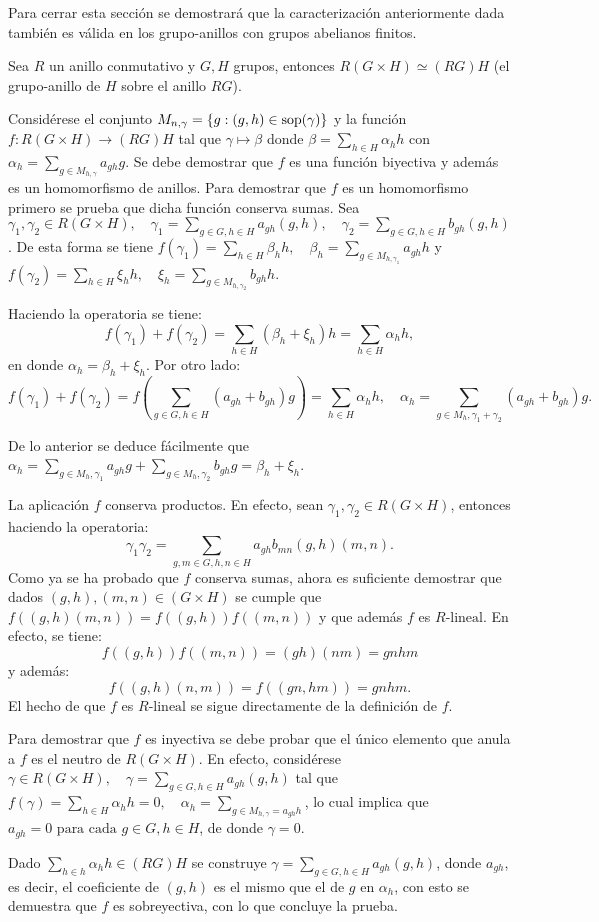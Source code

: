 Para cerrar esta sección se demostrará que la caracterización anteriormente dada  también es válida en los grupo-anillos con grupos  abelianos finitos.

\begin{lema}\label{lema1}
Sea $R$ un anillo conmutativo y $G, H$ grupos, entonces $R(G \times H) \simeq (RG)H$ (el grupo-anillo de $H$ sobre el anillo $RG$).
\end{lema}
\begin{proof*}
Considérese el conjunto $M_{n,\gamma} = \{ g: (g,h) \in \operatorname{sop}(\gamma)\}$ y la función $f \colon R(G \times H) \to (RG)H$ tal que $\gamma \mapsto \beta $ donde $\beta = \sum_{h \in H} \alpha_hh $  con $\alpha_h = \sum_{g \in M_{h,\gamma}}a_{gh}g$. Se debe demostrar que $f$ es una función biyectiva y además es un homomorfismo de anillos.
Para demostrar que $f$ es un homomorfismo primero se prueba que dicha función conserva sumas.
Sea $\gamma_1, \gamma_2 \in R(G \times H),\quad \gamma_1 = \sum_{g \in G, h \in H}a_{gh}(g,h), \quad  \gamma_2 = \sum_{g\in G, h\in H}b_{gh}(g,h)$. De esta forma se tiene $f(\gamma_1) = \sum_{h \in H}\beta_hh, \quad \beta_h = \sum_{g\in M_{h,\gamma_1}}a_{gh}h$ y $f(\gamma_2) = \sum_{h\in H}\xi_hh,\quad \xi_h = \sum_{g \in M_{h,\gamma_2}}b_{gh}h$.

Haciendo la operatoria se tiene:
\[ f(\gamma_1) + f(\gamma_2) = \sum_{h\in H}(\beta_h+\xi_h)h = \sum_{h\in H}\alpha_hh,\]
en donde $\alpha_h = \beta_h + \xi_h$.
Por otro lado:
\[ f(\gamma_1) + f(\gamma_2) = f\left(\sum_{g\in G, h\in H} (a_{gh} + b_{gh})g\right) = \sum_{h \in H}\alpha_hh, \quad \alpha_h = \sum_{g \in M_h, \gamma_1 + \gamma_2}(a_{gh} + b_{gh})g.\]

De lo anterior se deduce fácilmente que $\alpha_h = \sum_{g \in M_h, \gamma_1}a_{gh}g + \sum_{g \in M_h, \gamma_2}b_{gh}g = \beta_h + \xi_h$.

La aplicación $f$ conserva productos. En efecto, sean $\gamma_1,\gamma_2 \in R(G \times H)$, entonces haciendo la operatoria:
\[\gamma_1\gamma_2 = \sum_{g,m \in G, h,n \in H} a_{gh}b_{mn}(g,h)(m,n).\]
Como ya se ha probado que $f$ conserva sumas, ahora es suficiente demostrar que dados $(g,h), (m,n) \in (G \times H)$ se cumple que $f((g,h)(m,n)) = f((g,h))f((m,n))$ y que además $f$ es $R\mbox{-lineal}$. En efecto, se tiene: 
\[ f((g,h))f((m,n)) = (gh)(nm) = gnhm  \]
y además:
\[  f((g,h)(n,m)) = f((gn,hm)) = gnhm.\]
El hecho de que $f$ es $R\mbox{-lineal}$ se sigue directamente de la definición de $f$.

Para demostrar que $f$ es inyectiva se debe probar que el único elemento que anula a $f$ es el neutro de $R(G\times H)$. En efecto, considérese $\gamma \in R(G\times H), \quad \gamma = \sum_{g \in G, h\in H}a_{gh}(g,h) $ tal que $f(\gamma) = \sum_{h \in H}\alpha_hh = 0 , \quad \alpha_h = \sum_{g \in M_{h,\gamma} = a_{gh}h}$, lo cual implica que $a_{gh} = 0 \mbox{ para cada } g \in G, h\in H$, de donde $\gamma = 0$.

Dado $\sum_{h \in h}\alpha_hh \in (RG)H$ se construye $\gamma = \sum_{g \in G, h\in H}a_{gh}(g,h)$, donde $a_{gh}$, es decir, el coeficiente de $(g,h)$ es el mismo que el de $g$ en $\alpha_h$, con esto se demuestra que $f$ es sobreyectiva, con lo que concluye la prueba. 
\qedhere
\end{proof*}
